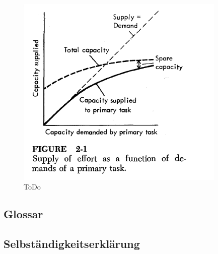 \documentclass{llncs}					%
\begin{document}
\begin{figure}[htbp]
	\begin{center}
		\includegraphics[width = 10cm]{Grafiken/28-Attetntion-Reserves.png}
		\caption{ToDo}
		\label{28-Attetntion-Reserves}
	\end{center}
\end{figure}


\clearpage
\subsection{Glossar}\label{glossar}

\renewcommand*{\glossarysection}[2][]{}	%
\printnoidxglossaries				%

\subsection{Selbständigkeitserklärung}

\clearpage

\end{document}
